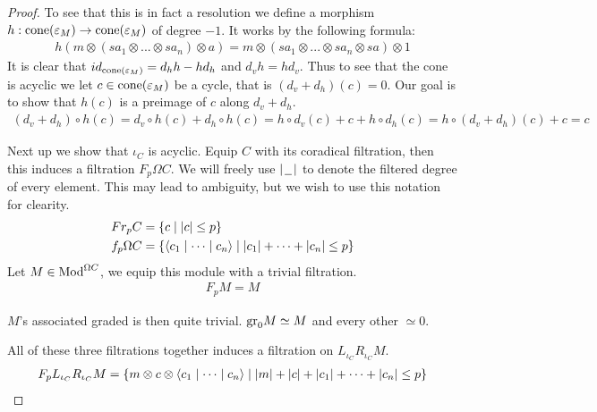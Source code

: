 \documentclass[../thesis.tex]{subfiles}
\begin{document}
\begin{proof}
                To see that this is in fact a resolution we define a morphism $h : \tt{cone}(\varepsilon_M) \rightarrow \tt{cone}(\varepsilon_M)$ of degree $-1$. It works by the following formula:
                \begin{align*}
                    h(m \otimes (sa_1 \otimes ... \otimes sa_n) \otimes a) = m \otimes (sa_1 \otimes ... \otimes sa_n \otimes sa) \otimes 1
                \end{align*}
                It is clear that $id_{\tt{cone}(\varepsilon_M)} = d_hh - hd_h$ and $d_vh = hd_v$. Thus to see that the cone is acyclic we let $c\in \tt{cone}(\varepsilon_M)$ be a cycle, that is $(d_v + d_h)(c) = 0$. Our goal is to show that $h(c)$ is a preimage of $c$ along $d_v + d_h$.
                \begin{multline*}
                    (d_v + d_h)\circ h(c) = d_v\circ h(c) + d_h\circ h(c) = h\circ d_v(c) + c + h\circ d_h(c) = h\circ (d_v + d_h)(c) + c = c
                \end{multline*}

                Next up we show that $\iota_C$ is acyclic. Equip $C$ with its coradical filtration, then this induces a filtration $F_p\Omega C$. We will freely use $|\argument |$ to denote the filtered degree of every element. This may lead to ambiguity, but we wish to use this notation for clearity.
                \begin{align*}
                    Fr_pC & = \startset{c \mid |c| \leq p} \\
                    f_p\Omega C & = \startset{\langle c_1 \mid \cdots \mid c_n \rangle \mid |c_1| + \cdots + |c_n| \leq p }
                \end{align*}
                Let $M \in \tt{Mod}^{\Omega C}$, we equip this module with a trivial filtration.
                \begin{align*}
                    F_pM = M
                \end{align*}

                $M$'s associated graded is then quite trivial. $\tt{gr}_0M \simeq M$ and every other $\simeq 0$.

                All of these three filtrations together induces a filtration on $L_{\iota_C}R_{\iota_C}M$.
                \begin{align*}
                    F_pL_{\iota_C}R_{\iota_C}M = \startset{m \otimes c \otimes \langle c_1 \mid \cdots \mid c_n \rangle \mid |m| + |c| + |c_1| + \cdots + |c_n| \leq p}
                \end{align*}


\end{proof}
\end{document}

